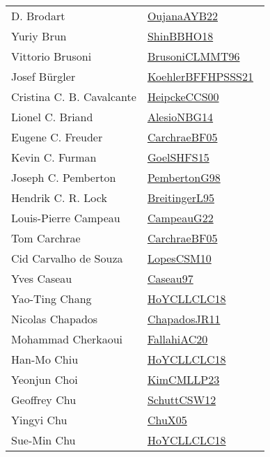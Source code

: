 {\begin{longtable}{p{4cm}p{20cm}}
D. Brodart & \href{works/OujanaAYB22.pdf}{OujanaAYB22}~\cite{OujanaAYB22}\\
Yuriy Brun & \href{works/ShinBBHO18.pdf}{ShinBBHO18}~\cite{ShinBBHO18}\\
Vittorio Brusoni & \href{works/BrusoniCLMMT96.pdf}{BrusoniCLMMT96}~\cite{BrusoniCLMMT96}\\
Josef B{\"{u}}rgler & \href{works/KoehlerBFFHPSSS21.pdf}{KoehlerBFFHPSSS21}~\cite{KoehlerBFFHPSSS21}\\
Cristina C. B. Cavalcante & \href{works/HeipckeCCS00.pdf}{HeipckeCCS00}~\cite{HeipckeCCS00}\\
Lionel C. Briand & \href{works/AlesioNBG14.pdf}{AlesioNBG14}~\cite{AlesioNBG14}\\
Eugene C. Freuder & \href{works/CarchraeBF05.pdf}{CarchraeBF05}~\cite{CarchraeBF05}\\
Kevin C. Furman & \href{works/GoelSHFS15.pdf}{GoelSHFS15}~\cite{GoelSHFS15}\\
Joseph C. Pemberton & \href{works/PembertonG98.pdf}{PembertonG98}~\cite{PembertonG98}\\
Hendrik C. R. Lock & \href{}{BreitingerL95}~\cite{BreitingerL95}\\
Louis{-}Pierre Campeau & \href{works/CampeauG22.pdf}{CampeauG22}~\cite{CampeauG22}\\
Tom Carchrae & \href{works/CarchraeBF05.pdf}{CarchraeBF05}~\cite{CarchraeBF05}\\
Cid Carvalho de Souza & \href{works/LopesCSM10.pdf}{LopesCSM10}~\cite{LopesCSM10}\\
Yves Caseau & \href{works/Caseau97.pdf}{Caseau97}~\cite{Caseau97}\\
Yao{-}Ting Chang & \href{works/HoYCLLCLC18.pdf}{HoYCLLCLC18}~\cite{HoYCLLCLC18}\\
Nicolas Chapados & \href{works/ChapadosJR11.pdf}{ChapadosJR11}~\cite{ChapadosJR11}\\
Mohammad Cherkaoui & \href{works/FallahiAC20.pdf}{FallahiAC20}~\cite{FallahiAC20}\\
Han{-}Mo Chiu & \href{works/HoYCLLCLC18.pdf}{HoYCLLCLC18}~\cite{HoYCLLCLC18}\\
Yeonjun Choi & \href{works/KimCMLLP23.pdf}{KimCMLLP23}~\cite{KimCMLLP23}\\
Geoffrey Chu & \href{works/SchuttCSW12.pdf}{SchuttCSW12}~\cite{SchuttCSW12}\\
Yingyi Chu & \href{works/ChuX05.pdf}{ChuX05}~\cite{ChuX05}\\
Sue{-}Min Chu & \href{works/HoYCLLCLC18.pdf}{HoYCLLCLC18}~\cite{HoYCLLCLC18}\\

\end{longtable}}
